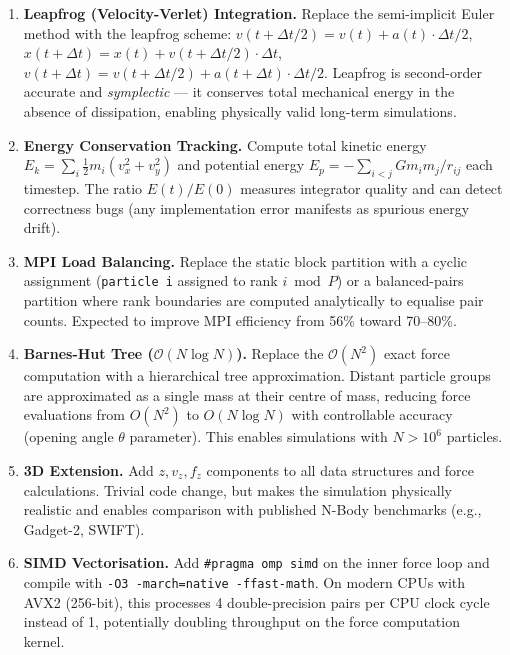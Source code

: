 ﻿\documentclass[12pt,a4paper]{article}
\begin{document}
\begin{enumerate}
    \item \textbf{Leapfrog (Velocity-Verlet) Integration.}
            Replace the semi-implicit Euler method with the leapfrog scheme:
          $v(t+\Delta t/2) = v(t) + a(t)\cdot\Delta t/2$,
          $x(t+\Delta t) = x(t) + v(t+\Delta t/2)\cdot\Delta t$,
          $v(t+\Delta t) = v(t+\Delta t/2) + a(t+\Delta t)\cdot\Delta t/2$.
          Leapfrog is second-order accurate and \emph{symplectic} ---
          it conserves total mechanical energy in the absence of dissipation,
          enabling physically valid long-term simulations.

    \item \textbf{Energy Conservation Tracking.}
          Compute total kinetic energy
          $E_k = \sum_i \frac{1}{2} m_i (v_x^2 + v_y^2)$
          and potential energy
          $E_p = -\sum_{i<j} G m_i m_j / r_{ij}$
          each timestep. The ratio $E(t)/E(0)$ measures integrator quality
          and can detect correctness bugs (any implementation error manifests
          as spurious energy drift).

    \item \textbf{MPI Load Balancing.}
          Replace the static block partition with a cyclic assignment
          (\texttt{particle i} assigned to rank $i \bmod P$) or a
          balanced-pairs partition where rank boundaries are computed
          analytically to equalise pair counts. Expected to improve MPI
          efficiency from 56\% toward 70--80\%.

    \item \textbf{Barnes-Hut Tree ($\mathcal{O}(N \log N)$).}
          Replace the $\mathcal{O}(N^2)$ exact force computation with a
          hierarchical tree approximation. Distant particle groups are
          approximated as a single mass at their centre of mass, reducing
          force evaluations from $O(N^2)$ to $O(N \log N)$ with controllable
          accuracy (opening angle $\theta$ parameter). This enables
          simulations with $N > 10^6$ particles.

    \item \textbf{3D Extension.}
          Add $z, v_z, f_z$ components to all data structures and force
          calculations. Trivial code change, but makes the simulation
          physically realistic and enables comparison with published N-Body
          benchmarks (e.g., Gadget-2, SWIFT).

    \item \textbf{SIMD Vectorisation.}
          Add \texttt{\#pragma omp simd} on the inner force loop and compile
          with \texttt{-O3 -march=native -ffast-math}. On modern CPUs with
          AVX2 (256-bit), this processes 4 double-precision pairs per CPU
          clock cycle instead of 1, potentially doubling throughput on the
          force computation kernel.


\end{enumerate}
\end{document}
